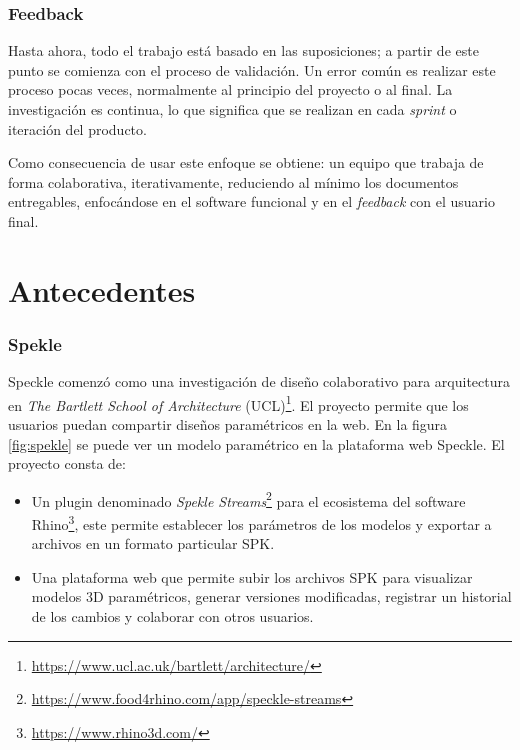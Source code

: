 \subsubsection{Feedback}
Hasta ahora, todo el trabajo está basado en las suposiciones; a partir de este punto se comienza con el proceso de validación. 
Un error común es realizar este proceso pocas veces, normalmente al principio del proyecto o al final.
La investigación es continua, lo que significa que se realizan en cada \textit{sprint} o iteración del producto.



Como consecuencia de usar este enfoque se obtiene: un equipo que trabaja de forma colaborativa, iterativamente, reduciendo al mínimo los documentos entregables, enfocándose en el software funcional y en el \textit{feedback} con el usuario final.


\section{Antecedentes}
\subsubsection{Spekle}
Speckle \citep{TheBartlett2015} comenzó como una investigación de diseño colaborativo para arquitectura en \textit{The Bartlett School of Architecture} (UCL)\footnote{\url{https://www.ucl.ac.uk/bartlett/architecture/}}.
El proyecto permite que los usuarios puedan compartir diseños paramétricos en la web. En la figura \ref{fig:spekle} se puede ver un modelo paramétrico en la plataforma web Speckle. El proyecto consta de:
\begin{itemize}
    \item Un plugin denominado \textit{Spekle Streams}\footnote{\url{https://www.food4rhino.com/app/speckle-streams}}  para el ecosistema del software  Rhino\footnote{\url{https://www.rhino3d.com/}}, este permite establecer los parámetros de los modelos y exportar a archivos en un formato particular SPK.
    \item Una plataforma web que permite subir los archivos SPK para visualizar modelos 3D paramétricos, generar versiones modificadas, registrar un historial de los cambios y colaborar con otros usuarios.
\end{itemize}

